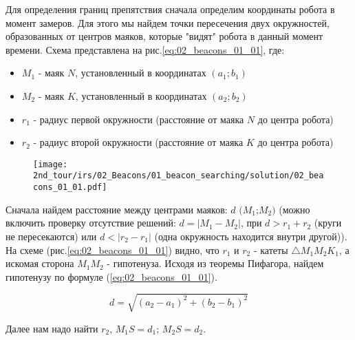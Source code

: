 \solutionSection

Для определения границ препятствия сначала определим координаты робота в момент замеров. Для этого мы найдем точки пересечения двух окружностей, образованных от центров маяков, которые "видят" робота в данный момент времени. Схема представлена на рис.\ref{eq:02_beacons_01_01}, где: \\

\begin{itemize}
	\item $M_1$ - маяк $N$, установленный в координатах $(a_1; b_1)$
	\item $M_2$ - маяк $K$, установленный в координатах $(a_2; b_2)$
	\item $r_1$ - радиус первой окружности (расстояние от маяка $N$ до центра робота)
	\item $r_2$ - радиус второй окружности (расстояние от маяка $K$ до центра робота)
\end{itemize}

\begin{figure}[H]
	\centering
	\texttt{[image: 2nd\_tour/irs/02\_Beacons/01\_beacon\_searching/solution/02\_beacons\_01\_01.pdf]}
	\caption{}
	\label{fig:02_beacons_01_01}
\end{figure}

Сначала найдем расстояние между центрами маяков: $d$ $(M_1$;$M_2)$ (можно включить проверку отсутствие решений: $d = |M_1 - M_2|$, при $d > r_1 + r_2$ (круги не пересекаются) или $d < |r_2 - r_1|$ (одна окружность находится внутри другой)).
На схеме (рис.\ref{eq:02_beacons_01_01}) видно, что $r_1$ и $r_2$ - катеты $\triangle M_1M_2K_1$, а искомая сторона $M_1M_2$ - гипотенуза. Исходя из теоремы Пифагора, найдем гипотенузу по формуле (\ref{eq:02_beacons_01_01}).

\begin{equation}
	d = \sqrt{{(a_2 - a_1)}^2 + {(b_2 - b_1)}^2}
	\label{eq:02_beacons_01_01}
\end{equation}

Далее нам надо найти $r_2$, $M_1S = d_1$; $M_2S = d_2$.


